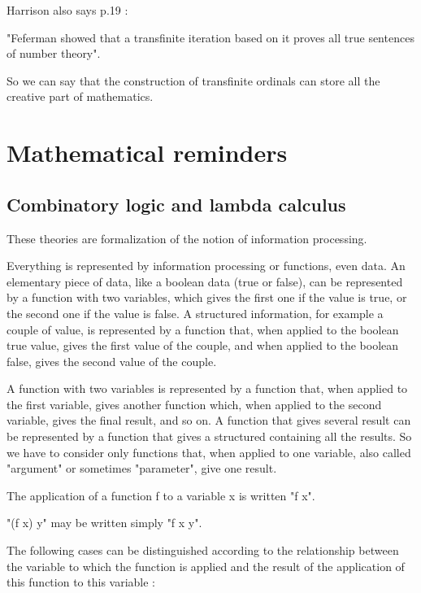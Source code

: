 \documentclass[10pt]{article}
\begin{document}
Harrison also says p.19 : 

"Feferman showed that a transfinite iteration based on it proves all true sentences of number theory". 

So we can say that the construction of transfinite ordinals can store all the creative part of mathematics. 

\section{Mathematical reminders}

\subsection{Combinatory logic and lambda calculus}

These theories are formalization of the notion of information processing. 

Everything is represented by information processing or functions, even data. An elementary piece of data, like a boolean data (true or false), can be represented by a function with two variables, which gives the first one if the value is true, or the second one if the value is false. A structured information, for example a couple of value, is represented by a function that, when applied to the boolean true value, gives the first value of the couple, and when applied to the boolean false, gives the second value of the couple.

A function with two variables is represented by a function that, when applied to the first variable, gives another function which, when applied to the second variable, gives the final result, and so on. A function that gives several result can be represented by a function that gives a structured containing all the results. So we have to consider only functions that, when applied to one variable, also called "argument" or sometimes "parameter", give one result.

The application of a function f to a variable x is written "f x".

"(f x) y" may be written simply "f x y".

The following cases can be distinguished according to the relationship between the variable to which the function is applied and the result of the application of this function to this variable :
\end{document}
